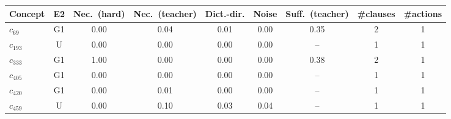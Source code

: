 \begin{tabular}{lcccccccc}
\toprule
Concept & E2 & Nec.\ (hard) & Nec.\ (teacher) & Dict.-dir. & Noise & Suff.\ (teacher) & \#clauses & \#actions \\
\midrule
$c_{69}$ & G1 & 0.00 & 0.04 & 0.01 & 0.00 & 0.35 & 2 & 1 \\
$c_{193}$ & U & 0.00 & 0.00 & 0.00 & 0.00 & -- & 1 & 1 \\
$c_{333}$ & G1 & 1.00 & 0.00 & 0.00 & 0.00 & 0.38 & 2 & 1 \\
$c_{405}$ & G1 & 0.00 & 0.00 & 0.00 & 0.00 & -- & 1 & 1 \\
$c_{420}$ & G1 & 0.00 & 0.01 & 0.00 & 0.00 & -- & 1 & 1 \\
$c_{459}$ & U & 0.00 & 0.10 & 0.03 & 0.04 & -- & 1 & 1 \\
\bottomrule
\end{tabular}